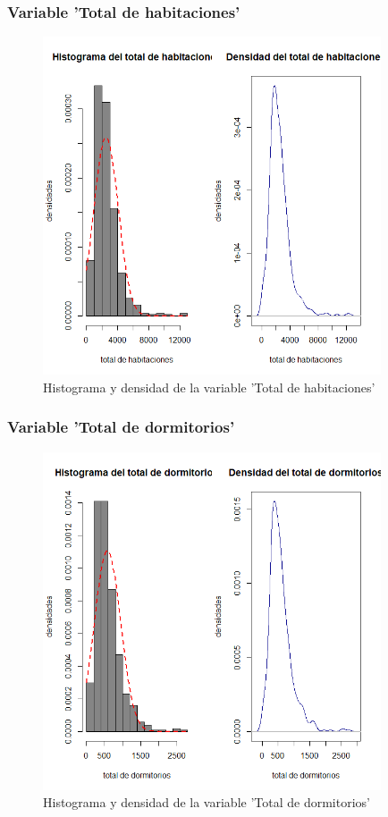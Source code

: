 \documentclass[12pt]{beamer}
\begin{document}
\begin{frame}
\frametitle{Variable 'Total de habitaciones'}
\begin{figure}[!h]
    \begin{center}
        \includegraphics[width=10cm]{imagenes/4.png}
        \caption{Histograma y densidad de la variable 'Total de habitaciones'}
        \label{fig:Densidad}
    \end{center}
\end{figure}
\end{frame}

\begin{frame}
\frametitle{Variable 'Total de dormitorios'}
\begin{figure}[!h]
    \begin{center}
        \includegraphics[width=10cm]{imagenes/5.png}
        \caption{Histograma y densidad de la variable 'Total de dormitorios'}
        \label{fig:Densidad}
    \end{center}
\end{figure}
\end{frame}
\end{document}
